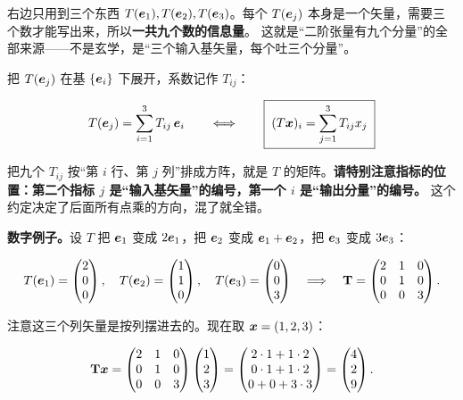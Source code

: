 \documentclass[11pt]{ctexart}
\newcommand{\ten}[1]{\mathbf{#1}}
\let\origsubhdr\subhdr
\renewcommand{\subhdr}[1]{\par\needspace{3\baselineskip}\origsubhdr{#1}}
\begin{document}
右边只用到三个东西 $T(\boldsymbol{e}_1),T(\boldsymbol{e}_2),T(\boldsymbol{e}_3)$。每个 $T(\boldsymbol{e}_j)$ 本身是一个矢量，需要三个数才能写出来，所以\textbf{一共九个数的信息量}。
这就是“二阶张量有九个分量”的全部来源——不是玄学，是“三个输入基矢量，每个吐三个分量”。


把 $T(\boldsymbol{e}_j)$ 在基 $\{\boldsymbol{e}_i\}$ 下展开，系数记作 $T_{ij}$：

\[
T(\boldsymbol{e}_j)=\sum_{i=1}^{3}T_{ij}\,\boldsymbol{e}_i
\qquad\Longleftrightarrow\qquad
\boxed{\;(T\boldsymbol{x})_i=\sum_{j=1}^{3}T_{ij}x_j\;}
\]

把九个 $T_{ij}$ 按“第 $i$ 行、第 $j$ 列”排成方阵，就是 $T$ 的矩阵。\textbf{请特别注意指标的位置：第二个指标 $j$ 是“输入基矢量”的编号，第一个 $i$ 是“输出分量”的编号。} 这个约定决定了后面所有点乘的方向，混了就全错。

\textbf{数字例子。}设 $T$ 把 $\boldsymbol{e}_1$ 变成 $2\boldsymbol{e}_1$，把 $\boldsymbol{e}_2$ 变成 $\boldsymbol{e}_1+\boldsymbol{e}_2$，把 $\boldsymbol{e}_3$ 变成 $3\boldsymbol{e}_3$：

\[
T(\vect e_1)=\begin{pmatrix}2\\0\\0\end{pmatrix},\quad
T(\vect e_2)=\begin{pmatrix}1\\1\\0\end{pmatrix},\quad
T(\vect e_3)=\begin{pmatrix}0\\0\\3\end{pmatrix}
\quad\Longrightarrow\quad
\ten T=\begin{pmatrix}2&1&0\\0&1&0\\0&0&3\end{pmatrix}.
\]

注意这三个列矢量是按列摆进去的。现在取 $\boldsymbol{x}=(1,2,3)$：

\[
\ten T\vect x=\begin{pmatrix}2&1&0\\0&1&0\\0&0&3\end{pmatrix}\begin{pmatrix}1\\2\\3\end{pmatrix}
=\begin{pmatrix}2\cdot1+1\cdot2\\0\cdot1+1\cdot2\\0+0+3\cdot3\end{pmatrix}=\begin{pmatrix}4\\2\\9\end{pmatrix}.
\]
\end{document}
